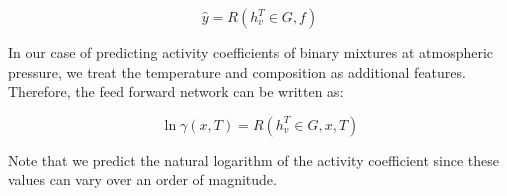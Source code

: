 \begin{equation}
    \hat y = R(h_v^T \in G, f)
\end{equation}

In our case of predicting activity coefficients of binary mixtures at atmospheric pressure, we treat the temperature and composition as additional features. Therefore, the feed forward network can be written as:

\begin{equation}
   \ln \gamma(x,T)= R(h_v^T \in G, x, T)
\end{equation}

Note that we predict the natural logarithm of the activity coefficient since these values can vary over an order of magnitude.




